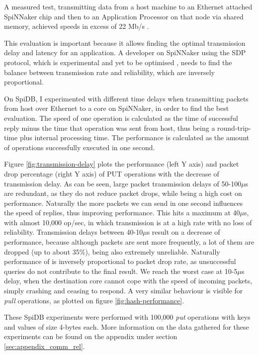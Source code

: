 A measured test, transmitting data from a host machine to an Ethernet attached SpiNNaker chip and then to an Application Processor on that node via shared memory, achieved speeds in excess of 22 Mb/s \cite{scalablecomm}.

This evaluation is important because it allows finding the optimal transmission delay and latency for an application. A developer on SpiNNaker using the SDP protocol, which is experimental and yet to be optimised \cite{scalablecomm}, needs to find the balance between transmission rate and reliability, which are inversely proportional.

On SpiDB, I experimented with different time delays when transmitting packets from host over Ethernet to a core on SpiNNaker, in order to find the best evaluation. The speed of one operation is calculated as the time of successful reply minus the time that operation was sent from host, thus being a round-trip-time plus internal processing time. The performance is calculated as the amount of operations successfully executed in one second.

Figure \ref{fig:transmission-delay} plots the performance (left Y axis) and packet drop percentage (right Y axis) of PUT operations  with the decrease of transmission delay. As can be seen, large packet transmission delays of 50-100$\mu$s are redundant, as they do not reduce packet drops, while being a high cost on performance. Naturally the more packets we can send in one second influences the speed of replies, thus improving performance. This hits a maximum at 40$\mu$s, with almost 10,000 op/sec, in which transmission is at a high rate with no loss of reliability. Transmission delays between 40-10$\mu$s result on a decrease of performance, because although packets are sent more frequently, a lot of them are dropped (up to about 35\%), being also extremely unreliable. Naturally performance of is inversely proportional to packet drop rate, as unsuccessful queries do not contribute to the final result. We reach the worst case at 10-5$\mu$s delay, when the destination core cannot cope with the speed of incoming packets, simply crashing and ceasing to respond. A very similar behaviour is visible for \textit{pull} operations, as plotted on figure \ref{fig:hash-performance}.

These SpiDB experiments were performed with 100,000 \textit{put} operations with keys and values of size 4-bytes each. More information on the data gathered for these experiments can be found on the appendix under section \ref{sec:appendix_comm_rel}.

